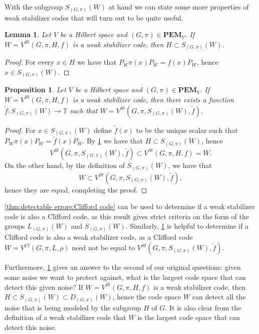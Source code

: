 \documentclass[11pt, oneside, reqno]{amsart}
\newcommand{\bbT}{\mathbb{T}}
\newcommand{\PEM}{\mathbf{PEM}}
\theoremstyle{definition}
\theoremstyle{plain}
\newtheorem{proposition}[definition]{Proposition}
\newtheorem{lemma}[definition]{Lemma}
\theoremstyle{remark}
\begin{document}
With the subgroup $S_{(G,\pi)}(W)$ at hand we can state some more properties of weak stabilizer codes that will turn out to be quite useful.

\begin{lemma}\label{lemma:stabilizers of stabilizer code}
    Let $V$ be a Hilbert space and $(G,\pi) \in \PEM_V$. If $W = V^{St}(G,\pi,H,f)$ is a weak stabilizer code, then $H \subset S_{(G,\pi)}(W)$.
\end{lemma}
\begin{proof}
    For every $x \in H$ we have that $P_W\pi(x)P_W = f(x)P_W$, hence $x \in S_{(G,\pi)}(W)$.
\end{proof}

\begin{proposition}\label{prop:stabilizer codes of whole stabilizer group}
    Let $V$ be a Hilbert space and $(G,\pi) \in \PEM_V$. If $W = V^{St}(G,\pi,H,f)$ is a weak stabilizer code, then there exists a function $\tilde{f} \colon S_{(G,\pi)}(W) \to \bbT$ such that $W = V^{St}(G,\pi,S_{(G,\pi)}(W),\tilde{f})$.
\end{proposition}
\begin{proof}
    For $x \in S_{(G,\pi)}(W)$ define $\tilde{f}(x)$ to be the unique scalar such that $P_W\pi(x)P_W = \tilde{f}(x)P_W$. By \cref{lemma:stabilizers of stabilizer code} we have that $H \subset S_{(G,\pi)}(W)$, hence
    \begin{equation*}
        V^{St}(G,\pi,S_{(G,\pi)}(W),\tilde{f}) \subset V^{St}(G,\pi,H,f) = W.
    \end{equation*}
    On the other hand, by the definition of $S_{(G,\pi)}(W)$, we have that
    \begin{equation*}
        W \subset V^{St}(G,\pi,S_{(G,\pi)}(W),\tilde{f}),
    \end{equation*}
    hence they are equal, completing the proof.
\end{proof}

\cref{thm:detectable errors:Clifford code} can be used to determine if a weak stabilizer code is also a Clifford code, as this result gives strict criteria on the form of the groups $L_{(G,\pi)}(W)$ and $S_{(G,\pi)}(W)$. Similarly, \cref{prop:stabilizer codes of whole stabilizer group} is helpful to determine if a Clifford code is also a weak stabilizer code, as a Clifford code $W = V^{Cl}(G,\pi,L,\rho)$ need not be equal to $V^{St}(G,\pi,S_{(G,\pi)}(W),\tilde{f})$.

Furthermore, \cref{lemma:stabilizers of stabilizer code} gives an answer to the second of our original questions: given some noise we want to protect against, what is the largest code space that can detect this given noise? If $W = V^{St}(G,\pi,H,f)$ is a weak stabilizer code, then $H \subset S_{(G,\pi)}(W) \subset D_{(G,\pi)}(W)$, hence the code space $W$ can detect all the noise that is being modeled by the subgroup $H$ of $G$. It is also clear from the definition of a weak stabilizer code that $W$ is the largest code space that can detect this noise.
\end{document}
